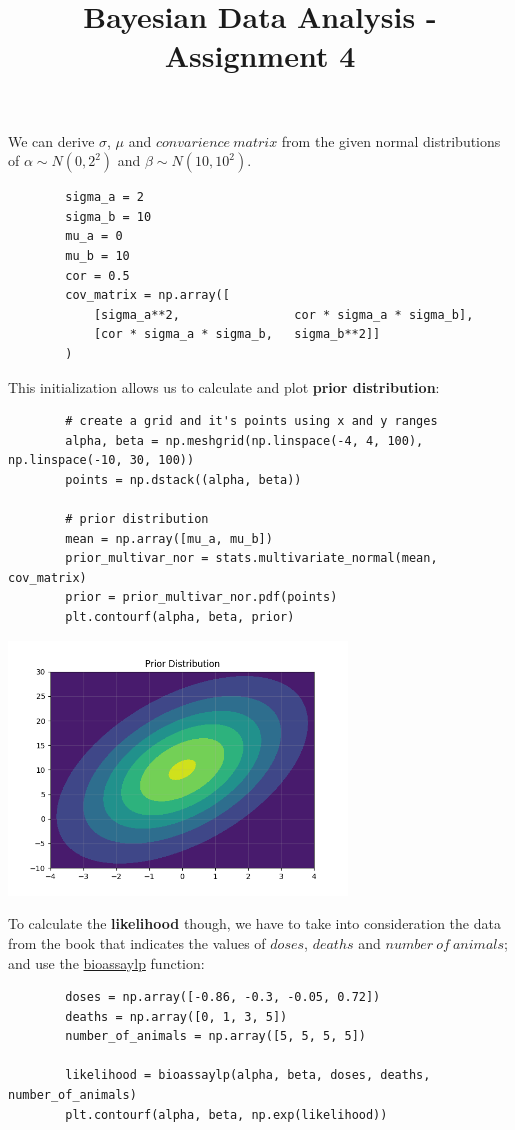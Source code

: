 \documentclass[11pt,a4paper,english]{article}
\title{Bayesian Data Analysis - Assignment 4}
\author{}
\begin{document}
      \maketitle

      We can derive $\sigma$, $\mu$ and $convarience\ matrix$ from the given
      normal distributions of $\alpha \sim N(0, 2^2)$ and $\beta \sim N(10, 10^2)$.

      \begin{verbatim}
        sigma_a = 2
        sigma_b = 10
        mu_a = 0
        mu_b = 10
        cor = 0.5
        cov_matrix = np.array([
            [sigma_a**2,                cor * sigma_a * sigma_b],
            [cor * sigma_a * sigma_b,   sigma_b**2]]
        )
      \end{verbatim}

      This initialization allows us to calculate and plot \textbf{prior distribution}:

      \begin{verbatim}
        # create a grid and it's points using x and y ranges
        alpha, beta = np.meshgrid(np.linspace(-4, 4, 100), np.linspace(-10, 30, 100))
        points = np.dstack((alpha, beta))

        # prior distribution
        mean = np.array([mu_a, mu_b])
        prior_multivar_nor = stats.multivariate_normal(mean, cov_matrix)
        prior = prior_multivar_nor.pdf(points)
        plt.contourf(alpha, beta, prior)
      \end{verbatim}

      \includegraphics[width=9cm]{1_prior_distribution.png}

      To calculate the \textbf{likelihood} though, we have to take into consideration the
      data from the book that indicates the values of $doses$, $deaths$ and $number\ of\ animals$; and
      use the \href{https://github.com/avehtari/BDA_course_Aalto/blob/master/exercises/additional_files/bioassaylp.py}{bioassaylp}
      function:
      \begin{verbatim}
        doses = np.array([-0.86, -0.3, -0.05, 0.72])
        deaths = np.array([0, 1, 3, 5])
        number_of_animals = np.array([5, 5, 5, 5])

        likelihood = bioassaylp(alpha, beta, doses, deaths, number_of_animals)
        plt.contourf(alpha, beta, np.exp(likelihood))
      \end{verbatim}
\end{document}
